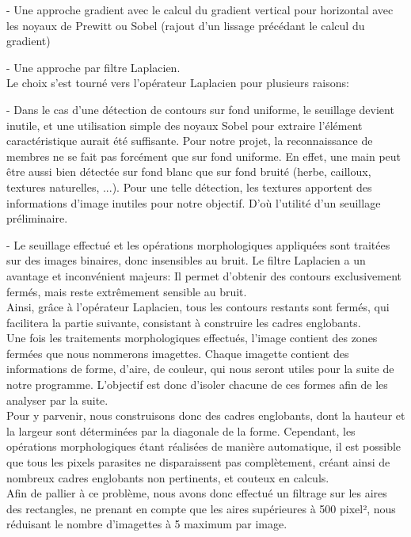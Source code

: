 \documentclass[10pt,a4paper]{report}
\begin{document}
	- Une approche gradient avec le calcul du gradient vertical pour horizontal avec les noyaux de Prewitt ou Sobel (rajout d'un lissage précédant le calcul du gradient)
	
	- Une approche par filtre Laplacien.\\
	\newline
Le choix s'est tourné vers l'opérateur Laplacien pour plusieurs raisons:

	- Dans le cas d'une détection de contours sur fond uniforme, le seuillage devient inutile, et une utilisation simple des noyaux Sobel pour extraire l'élément caractéristique aurait été suffisante. Pour notre projet, la reconnaissance de membres ne se fait pas forcément que sur fond uniforme. En effet, une main peut être aussi bien détectée sur fond blanc que sur fond bruité (herbe, cailloux, textures naturelles, ...). Pour une telle détection, les textures apportent des informations d'image inutiles pour notre objectif. D'où l'utilité d'un seuillage préliminaire.
	
	- Le seuillage effectué et les opérations morphologiques appliquées sont traitées sur des images binaires, donc insensibles au bruit. Le filtre Laplacien a un avantage et inconvénient majeurs: Il permet d'obtenir des contours exclusivement fermés, mais reste extrêmement sensible au bruit.\\
	\newline
Ainsi, grâce à l'opérateur Laplacien, tous les contours restants sont fermés, qui facilitera la partie suivante, consistant à construire les cadres englobants.\\
\newline
Une fois les traitements morphologiques effectués, l'image contient des zones fermées que nous nommerons imagettes. Chaque imagette contient des informations de forme, d'aire, de couleur, qui nous seront utiles pour la suite de notre programme. L'objectif est donc d'isoler chacune de ces formes afin de les analyser par la suite.\\
Pour y parvenir, nous construisons donc des cadres englobants, dont la hauteur et la largeur sont déterminées par la diagonale de la forme. Cependant, les opérations morphologiques étant réalisées de manière automatique, il est possible que tous les pixels parasites ne disparaissent pas complètement, créant ainsi de nombreux cadres englobants non pertinents, et couteux en calculs.\\
Afin de pallier à ce problème, nous avons donc effectué un filtrage sur les aires des rectangles, ne prenant en compte que les aires supérieures à 500 pixel², nous réduisant le nombre d'imagettes à 5 maximum par image.
\end{document}
